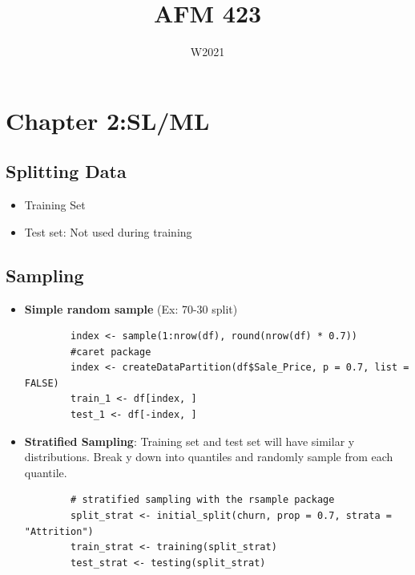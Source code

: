 \documentclass[12pt, oneside]{article}
\title{AFM 423}
\date{W2021}
\begin{document}
\maketitle

\newpage

\tableofcontents

\newpage

\section{Chapter 2:SL/ML}
\subsection{Splitting Data}
\begin{itemize}
    \item Training Set
    \item Test set: Not used during training
\end{itemize}

\subsection{Sampling}
\begin{itemize}
    \item \textbf{Simple random sample} (Ex: 70-30 split)
        \begin{verbatim}
        index <- sample(1:nrow(df), round(nrow(df) * 0.7))
        #caret package
        index <- createDataPartition(df$Sale_Price, p = 0.7, list = FALSE) 
        train_1 <- df[index, ]
        test_1 <- df[-index, ]
        \end{verbatim}
    \item \textbf{Stratified Sampling}: Training set and test set will have similar y distributions. Break y down into quantiles and randomly sample from each quantile. 
        \begin{verbatim}
        # stratified sampling with the rsample package
        split_strat <- initial_split(churn, prop = 0.7, strata = "Attrition")
        train_strat <- training(split_strat)
        test_strat <- testing(split_strat)
        \end{verbatim}
\end{itemize}
\end{document}
